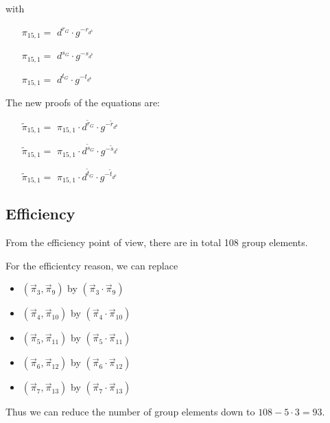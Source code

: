 \begin{description}
\begin{enumerate}
    with

    \begin{itemize}
    \item[$\pi_{15,1} = $] $d^{r_G} \cdot g^{-r_{d^b}}$    
    \item[$\pi_{15,1} = $] $d^{s_G} \cdot g^{-s_{d^b}}$    
    \item[$\pi_{15,1} = $] $d^{t_G} \cdot g^{-t_{d^b}}$
    \end{itemize}

    The new proofs of the equations are:
    
    \begin{itemize}
    \item[$\tilde{\pi}_{15,1} = $] $\pi_{15,1} \cdot d^{\tilde{r}_G} \cdot g^{-\tilde{r}_{d^b}}$    
    \item[$\tilde{\pi}_{15,1} = $] $\pi_{15,1} \cdot d^{\tilde{s}_G} \cdot g^{-\tilde{s}_{d^b}}$    
    \item[$\tilde{\pi}_{15,1} = $] $\pi_{15,1} \cdot d^{\tilde{t}_G} \cdot g^{-\tilde{t}_{d^b}}$
    \end{itemize}

    
  \end{enumerate}
\end{description}

\subsection{Efficiency}
From the efficiency point of view, there are in total 108 group elements.

For the efficientcy reason, we can replace
\begin{itemize}
\item $(\vec{\pi}_3,\vec{\pi}_9)$ by $(\vec{\pi}_3 \cdot \vec{\pi}_9)$
\item $(\vec{\pi}_4,\vec{\pi}_{10})$ by $(\vec{\pi}_4 \cdot\vec{\pi}_{10})$
\item $(\vec{\pi}_5,\vec{\pi}_{11})$ by $(\vec{\pi}_5 \cdot\vec{\pi}_{11})$
\item $(\vec{\pi}_6,\vec{\pi}_{12})$ by $(\vec{\pi}_6 \cdot\vec{\pi}_{12})$
\item $(\vec{\pi}_7,\vec{\pi}_{13})$ by $(\vec{\pi}_7 \cdot\vec{\pi}_{13})$
\end{itemize}

Thus we can reduce the number of group elements down to $108-5 \cdot 3 = 93$.



